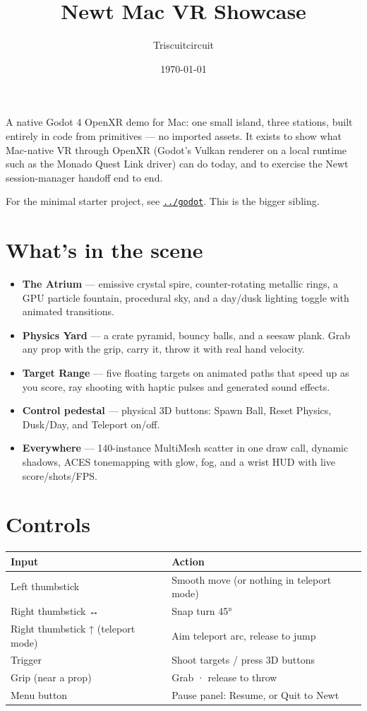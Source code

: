 \documentclass[11pt]{article}
\author{Triscuitcircuit}
\date{\today}
\title{Newt Mac VR Showcase}
\begin{document}
\maketitle
\tableofcontents

\clearpage

A native Godot 4 OpenXR demo for Mac: one small island, three stations,
built entirely in code from primitives — no imported assets. It exists to
show what Mac-native VR through OpenXR (Godot's Vulkan renderer on a local
runtime such as the Monado Quest Link driver) can do today, and to exercise
the Newt session-manager handoff end to end.

For the minimal starter project, see \href{../godot}{\texttt{../godot}}. This is the
bigger sibling.
\section{What's in the scene}
\label{sec:org660b164}
\begin{itemize}
\item \textbf{The Atrium} — emissive crystal spire, counter-rotating metallic rings,
a GPU particle fountain, procedural sky, and a day/dusk lighting toggle
with animated transitions.
\item \textbf{Physics Yard} — a crate pyramid, bouncy balls, and a seesaw plank.
Grab any prop with the grip, carry it, throw it with real hand velocity.
\item \textbf{Target Range} — five floating targets on animated paths that speed up
as you score, ray shooting with haptic pulses and generated sound effects.
\item \textbf{Control pedestal} — physical 3D buttons: Spawn Ball, Reset Physics,
Dusk/Day, and Teleport on/off.
\item \textbf{Everywhere} — 140-instance MultiMesh scatter in one draw call, dynamic
shadows, ACES tonemapping with glow, fog, and a wrist HUD with live
score/shots/FPS.
\end{itemize}
\section{Controls}
\label{sec:org2a37b4f}
\begin{center}
\begin{tabular}{ll}
Input & Action\\
\hline
Left thumbstick & Smooth move (or nothing in teleport mode)\\
Right thumbstick ↔ & Snap turn 45°\\
Right thumbstick ↑ (teleport mode) & Aim teleport arc, release to jump\\
Trigger & Shoot targets / press 3D buttons\\
Grip (near a prop) & Grab · release to throw\\
Menu button & Pause panel: Resume, or Quit to Newt\\
\end{tabular}
\end{center}
\end{document}
